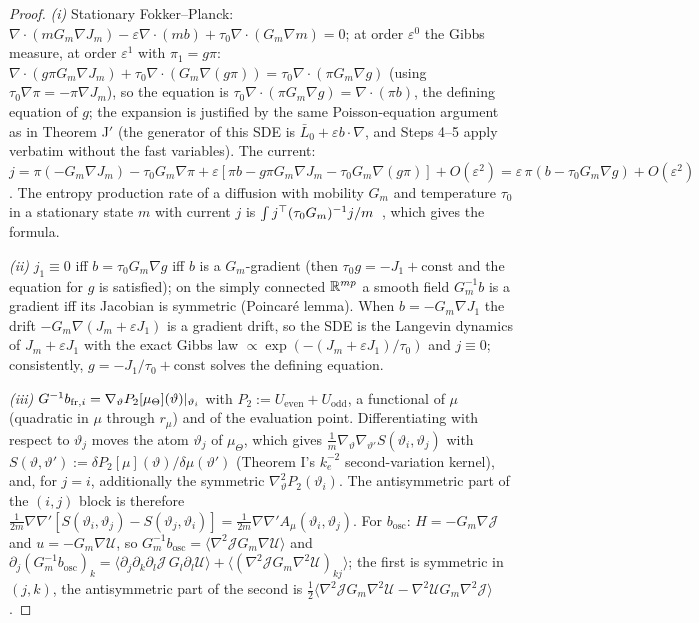 \begin{proof}
\textit{(i)} Stationary Fokker--Planck: $\nabla\cdot(mG_m\nabla J_m) - \varepsilon\nabla\cdot(mb)
+ \tau_0\nabla\cdot(G_m\nabla m) = 0$; at order $\varepsilon^0$ the Gibbs measure, at order $\varepsilon^1$ with
$\pi_1 = g\pi$: $\nabla\cdot(g\pi G_m\nabla J_m) + \tau_0\nabla\cdot(G_m\nabla(g\pi)) = \tau_0\nabla\cdot(\pi G_m\nabla g)$
(using $\tau_0\nabla\pi = -\pi\nabla J_m$), so the equation is $\tau_0\nabla\cdot(\pi G_m\nabla g) = \nabla\cdot(\pi b)$,
the defining equation of $g$; the expansion is justified by the same Poisson-equation argument as in Theorem J$'$
(the generator of this SDE is $\bar L_0 + \varepsilon b\cdot\nabla$, and Steps 4--5 apply verbatim without the fast
variables). The current: $j = \pi(-G_m\nabla J_m) - \tau_0G_m\nabla\pi
+ \varepsilon[\pi b - g\pi G_m\nabla J_m - \tau_0G_m\nabla(g\pi)] + O(\varepsilon^2)
= \varepsilon\,\pi(b - \tau_0G_m\nabla g) + O(\varepsilon^2)$. The entropy production rate of a diffusion with
mobility $G_m$ and temperature $\tau_0$ in a stationary state $m$ with current $j$ is
$\int j^\top(\tau_0G_m)^{-1}j/m$~\cite{S29}, which gives the formula.

\smallskip
\textit{(ii)} $j_1\equiv0$ iff $b = \tau_0G_m\nabla g$ iff $b$ is a $G_m$-gradient (then $\tau_0g = -J_1 + \mathrm{const}$
and the equation for $g$ is satisfied); on the simply connected $\mathbb{R}^{mp}$ a smooth field $G_m^{-1}b$ is a gradient iff
its Jacobian is symmetric (Poincar\'e lemma). When $b = -G_m\nabla J_1$ the drift $-G_m\nabla(J_m + \varepsilon J_1)$
is a gradient drift, so the SDE is the Langevin dynamics of $J_m + \varepsilon J_1$ with the exact Gibbs law
$\propto\exp(-(J_m + \varepsilon J_1)/\tau_0)$ and $j\equiv0$; consistently, $g = -J_1/\tau_0 + \mathrm{const}$ solves
the defining equation.

\smallskip
\textit{(iii)} $G^{-1} b_{\mathrm{fr},i} = \nabla_\vartheta P_2[\mu_\Theta](\vartheta)|_{\vartheta_i}$ with
$P_2 := U_{\mathrm{even}} + U_{\mathrm{odd}}$, a functional of $\mu$ (quadratic in $\mu$ through $r_\mu$) and of the
evaluation point. Differentiating with respect to $\vartheta_j$ moves the atom $\vartheta_j$ of $\mu_\Theta$, which
gives $\frac1m\nabla_\vartheta\nabla_{\vartheta'}S(\vartheta_i,\vartheta_j)$ with
$S(\vartheta,\vartheta') := \delta P_2[\mu](\vartheta)/\delta\mu(\vartheta')$ (Theorem I's $k_e^{-2}$
second-variation kernel), and, for $j = i$, additionally the symmetric $\nabla^2_\vartheta P_2(\vartheta_i)$. The
antisymmetric part of the $(i,j)$ block is therefore
$\frac1{2m}\nabla\nabla'[S(\vartheta_i,\vartheta_j) - S(\vartheta_j,\vartheta_i)] = \frac1{2m}\nabla\nabla'A_\mu(\vartheta_i,\vartheta_j)$.
For $b_{\mathrm{osc}}$: $H = -G_m\nabla\mathcal{J}$ and $u = -G_m\nabla\mathcal{U}$, so
$G_m^{-1}b_{\mathrm{osc}} = \langle\nabla^2\mathcal{J}G_m\nabla\mathcal{U}\rangle$ and
$\partial_j(G_m^{-1}b_{\mathrm{osc}})_k = \langle\partial_j\partial_k\partial_l\mathcal{J}\,G_l\partial_l\mathcal{U}\rangle
+ \langle(\nabla^2\mathcal{J}G_m\nabla^2\mathcal{U})_{kj}\rangle$; the first is symmetric in $(j,k)$, the
antisymmetric part of the second is
$\tfrac12\langle\nabla^2\mathcal{J}G_m\nabla^2\mathcal{U} - \nabla^2\mathcal{U}G_m\nabla^2\mathcal{J}\rangle$.


\end{proof}
